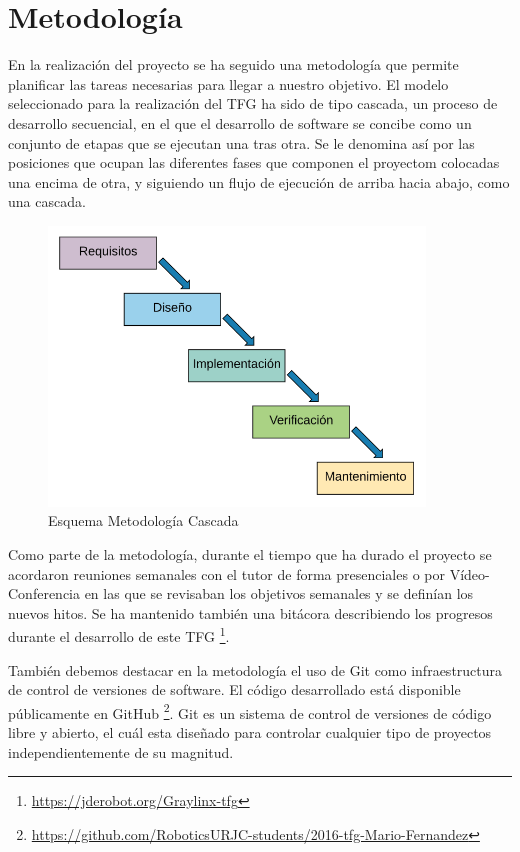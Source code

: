 \section{Metodología}
En la realización del proyecto se ha seguido una metodología que permite planificar las tareas necesarias para llegar a nuestro objetivo. El modelo seleccionado para la realización del TFG ha sido de tipo cascada, un proceso de desarrollo secuencial, en el que el desarrollo de software se concibe como un conjunto de etapas que se ejecutan una tras otra. Se le denomina así por las posiciones que ocupan las diferentes fases que componen el proyectom colocadas una encima de otra, y siguiendo un flujo de ejecución de arriba hacia abajo, como una cascada.


\begin{figure}[!h]
    \centering
    \includegraphics[width=100mm]{img/objetivos/cascada.png}
    \caption{Esquema Metodología Cascada}
\end{figure}

Como parte de la metodología, durante el tiempo que ha durado el proyecto se acordaron reuniones semanales con el tutor de forma presenciales o por Vídeo-Conferencia en las que se revisaban los objetivos semanales y se definían los nuevos hitos. Se ha mantenido también una bitácora describiendo los progresos durante el desarrollo de este TFG \footnote{\url{https://jderobot.org/Graylinx-tfg}}.

También debemos destacar en la metodología el uso de Git como infraestructura de control de versiones de software. El código desarrollado está disponible públicamente en GitHub \footnote{\url{https://github.com/RoboticsURJC-students/2016-tfg-Mario-Fernandez}}. Git es un sistema de control de versiones de código libre y abierto, el cuál esta diseñado para controlar cualquier tipo de proyectos independientemente de su magnitud.

